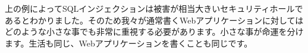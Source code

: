 上の例によってSQLインジェクションは被害が相当大きいセキュリティホールであるとわかりました。そのため我々が通常書くWebアプリケーションに対してはどのような小さな事でも非常に重視する必要があります。小さな事が命運を分けます。生活も同じ、Webアプリケーションを書くことも同じです。
